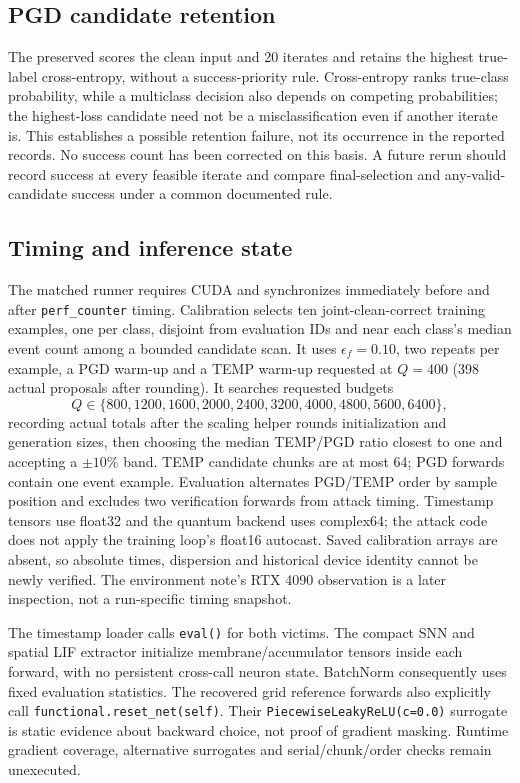 \subsection{PGD candidate retention}
The preserved  scores the clean input and 20 iterates and retains the highest true-label cross-entropy, without a success-priority rule. Cross-entropy ranks true-class probability, while a multiclass decision also depends on competing probabilities; the highest-loss candidate need not be a misclassification even if another iterate is. This establishes a possible retention failure, not its occurrence in the reported records. No success count has been corrected on this basis. A future rerun should record success at every feasible iterate and compare final-selection and any-valid-candidate success under a common documented rule.

\subsection{Timing and inference state}
The matched runner requires CUDA and synchronizes immediately before and after \texttt{perf\_counter} timing. Calibration selects ten joint-clean-correct training examples, one per class, disjoint from evaluation IDs and near each class's median event count among a bounded candidate scan. It uses $\epsilon_f=0.10$, two repeats per example, a PGD warm-up and a TEMP warm-up requested at $Q=400$ (398 actual proposals after rounding). It searches requested budgets
\[
Q\in\{800,1200,1600,2000,2400,3200,4000,4800,5600,6400\},
\]
recording actual totals after the scaling helper rounds initialization and generation sizes, then choosing the median TEMP/PGD ratio closest to one and accepting a $\pm10\%$ band. TEMP candidate chunks are at most 64; PGD forwards contain one event example. Evaluation alternates PGD/TEMP order by sample position and excludes two verification forwards from attack timing. Timestamp tensors use float32 and the quantum backend uses complex64; the attack code does not apply the training loop's float16 autocast. Saved calibration arrays are absent, so absolute times, dispersion and historical device identity cannot be newly verified. The environment note's RTX 4090 observation is a later inspection, not a run-specific timing snapshot.

The timestamp loader calls \texttt{eval()} for both victims. The compact SNN and spatial LIF extractor initialize membrane/accumulator tensors inside each forward, with no persistent cross-call neuron state. BatchNorm consequently uses fixed evaluation statistics. The recovered grid reference forwards also explicitly call \texttt{functional.reset\_net(self)}. Their \texttt{PiecewiseLeakyReLU(c=0.0)} surrogate is static evidence about backward choice, not proof of gradient masking. Runtime gradient coverage, alternative surrogates and serial/chunk/order checks remain unexecuted.

